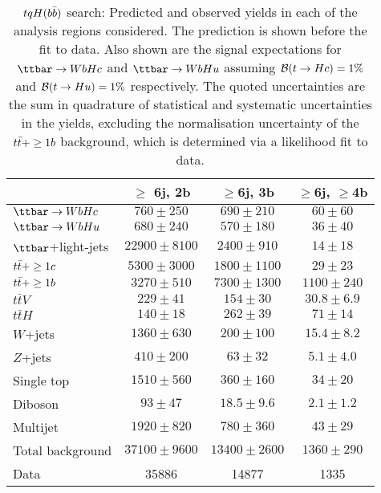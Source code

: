 \begin{table}[htbp]
\begin{center}
\begin{tabular}{l*{3}{c}}
\hline\hline
 & $\geq$ 6j, 2b & $\geq$6j, 3b & $\geq$6j, $\geq$4b \\
\hline
$\Hc$ & $ 760 \pm 250 $ &   $ 690 \pm 210 $ &   $ 60 \pm 60 $ \\ 
$\Hu$ & $ 680 \pm 240 $ &   $ 570 \pm 180 $ &   $ 36 \pm 40 $ \\ 
\hline
$\ttbar$+light-jets  &   $ 22900 \pm 8100 $ &   $ 2400 \pm 910 $ &   $ 14 \pm 18 $ \\ 
$t\bar{t}+\geq1c$  &   $ 5300 \pm 3000 $ &   $ 1800 \pm 1100 $ &   $ 29 \pm 23 $ \\ 
$t\bar{t}+\geq1b$  &   $ 3270 \pm 510 $ &   $ 7300 \pm 1300 $ &   $ 1100 \pm 240 $ \\ 
$t\bar{t}V$  &   $ 229 \pm 41 $ &   $ 154 \pm 30 $ &   $ 30.8 \pm 6.9 $ \\ 
$t\bar{t}H$  &   $ 140 \pm 18 $ &   $ 262 \pm 39 $ &   $ 71 \pm 14 $ \\ 
$W$+jets  &   $ 1360 \pm 630 $ &   $ 200 \pm 100 $ &   $ 15.4 \pm 8.2 $ \\ 
$Z$+jets  &   $ 410 \pm 200 $ &   $ 63 \pm 32 $ &   $ 5.1 \pm 4.0 $ \\ 
Single top  &   $ 1510 \pm 560 $ &   $ 360 \pm 160 $ &   $ 34 \pm 20 $ \\ 
Diboson  &   $ 93 \pm 47 $ &   $ 18.5 \pm 9.6 $ &   $ 2.1 \pm 1.2 $ \\ 
Multijet  &   $ 1920 \pm 820 $ &   $ 780 \pm 360 $ &   $ 43 \pm 29 $ \\ 
\hline
Total background &  $ 37100 \pm 9600 $ &   $ 13400 \pm 2600 $ &   $ 1360 \pm 290 $ \\ 
\hline
Data & 35886  & 14877  & 1335  \\ 
\hline\hline    
\end{tabular}

%
\end{center}
\caption{
$tqH(b\bar{b})$ search: Predicted and observed yields in each of the analysis regions considered.
The prediction is shown before the fit to data. Also shown are the signal expectations for 
$\Hc$ and $\Hu$ assuming $\mathcal{B}(t\to Hc)=1\%$ and $\mathcal{B}(t\to Hu)=1\%$ respectively.
The quoted uncertainties are the sum in quadrature of statistical and systematic uncertainties in the yields, 
excluding the normalisation uncertainty of the $t\bar{t}+\geq1b$ background, which is determined via a likelihood fit to data.
}
\label{tab:Hbb_Prefit_Yields_Unblind}
\end{table} 


